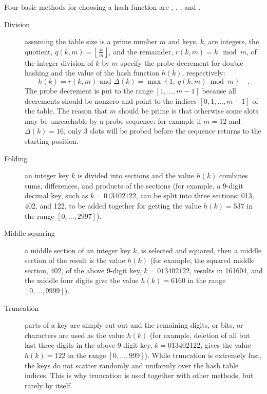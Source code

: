 Four basic methods for choosing a hash function
are , , , and 
.
\begin{description}
\item[Division] assuming the table size is a prime number \(m\) 
and keys, \(k\), are integers,
the quotient, \(q(k,m)=\left \lfloor \frac{k}{m} \right \rfloor \), 
and the remainder, \(r(k,m)=k \mod m\), of the integer division of
\(k\) by \(m\) specify the
probe decrement for double hashing and the value
of the hash function \(h(k)\), respectively:
$$
h(k) = r(k,m) \mbox{ and }
\Delta(k) = \max \left \{
1, \ q(k,m) \bmod m \right\} \quad . 
$$
The probe decrement is put to the range \([1,\ldots,m-1]\) because all
decrements should be nonzero and point to the indices
\([0,1,\ldots,m-1]\) of the table. The reason that $m$ should be prime is that 
otherwise some slots may be unreachable by a probe sequence: for example if 
$m=12$ and $\Delta(k) = 16$, only $3$ slots will be probed before the sequence
returns to the starting position.

\item[Folding] an integer key \(k\) is divided into sections and 
the value \(h(k)\) combines sums, differences, and products of
the sections (for example, a 9-digit decimal key, such as 
\(k=013402122\), can be split into three sections:
013, 402, and 122, to be added together for getting 
the value \(h(k)=537\) in the range \([0,\ldots,2997]\)).

\item[Middle-squaring] a middle section of an integer key
\(k\), is selected and squared, then a middle section of 
the result is the value \(h(k)\) (for example, the squared middle section, 402, of 
the above 9-digit key, \(k=013402122\), results in 161604, and
the middle four digits give the value \(h(k)=6160\) in the range
\([0,\ldots,9999]\)).

\item[Truncation] parts of a key are simply cut out and 
the remaining digits, or bits, or characters are used
as the value \(h(k)\)  
(for example, deletion of all but last three digits 
in the above 9-digit key, \(k=013402122\),
gives  
the value \(h(k)=122\) in the range \([0,\ldots,999]\)).
While truncation is extremely fast, the keys do not scatter
randomly and uniformly over the hash table indices. This is
why truncation is used together with other methods, but 
rarely by itself.
\end{description}

